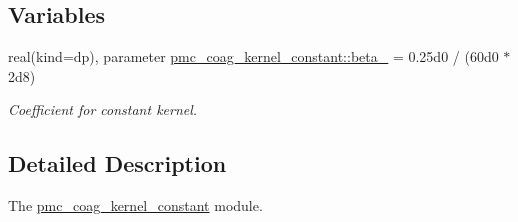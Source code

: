 \subsection*{Variables}
\begin{DoxyCompactItemize}
\item 
real(kind=dp), parameter \mbox{\hyperlink{namespacepmc__coag__kernel__constant_a26b296df0f2d1dd4d6f3f848b371b408}{pmc\+\_\+coag\+\_\+kernel\+\_\+constant\+::beta\+\_}} = 0.\+25d0 / (60d0 $\ast$ 2d8)
\begin{DoxyCompactList}\small\item\em Coefficient for constant kernel. \end{DoxyCompactList}\end{DoxyCompactItemize}


\subsection{Detailed Description}
The \mbox{\hyperlink{namespacepmc__coag__kernel__constant}{pmc\+\_\+coag\+\_\+kernel\+\_\+constant}} module. 

